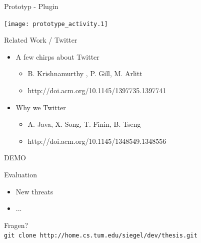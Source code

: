 \documentclass[11pt]{beamer}
\begin{document}
\begin{frame}[t]{Prototyp - Plugin}
  \vspace{-0.85em}
  \begin{center}
    \texttt{[image: prototype\_activity.1]}
  \end{center}
\end{frame}

\begin{frame}{Related Work / Twitter}
  \begin{itemize}
    \item A few chirps about Twitter
    \begin{itemize}
      \item B. Krishnamurthy , P. Gill, M. Arlitt
      \item http://doi.acm.org/10.1145/1397735.1397741
    \end{itemize}
    \item Why we Twitter
    \begin{itemize}
      \item A. Java, X. Song, T. Finin, B. Tseng
      \item http://doi.acm.org/10.1145/1348549.1348556
    \end{itemize}
  \end{itemize}
\end{frame}

\begin{frame}
  \begin{center}
  {\Huge DEMO}\\
  \end{center}
\end{frame}

\begin{frame}{Evaluation}
  \begin{itemize}
    \item New threats
    \item ...
  \end{itemize}
\end{frame}

\begin{frame}
  \begin{center}
  {\Huge Fragen?}\\

\vfill
  \texttt{git clone http://home.cs.tum.edu/siegel/dev/thesis.git}
  \end{center}
\end{frame}
\end{document}
